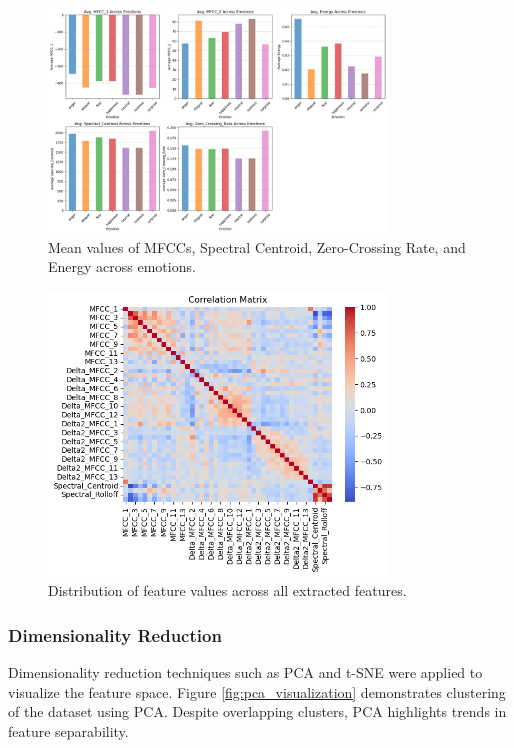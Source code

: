 \documentclass{article}
\begin{document}
\begin{figure}[!h]
    \centering
    \includegraphics[width=0.8\textwidth]{../assets/mfcc_analysis.png}
    \caption{Mean values of MFCCs, Spectral Centroid, Zero-Crossing Rate, and Energy across emotions.}
    \label{fig:mfcc_analysis}
\end{figure}

\begin{figure}[!h]
    \centering
    \includegraphics[width=0.8\textwidth]{../assets/feature_variability.png}
    \caption{Distribution of feature values across all extracted features.}
    \label{fig:feature_variability}
\end{figure}

\subsubsection*{Dimensionality Reduction}

Dimensionality reduction techniques such as PCA and t-SNE were applied to visualize the feature space. 
Figure \ref{fig:pca_visualization} demonstrates clustering of the dataset using PCA. Despite overlapping clusters, 
PCA highlights trends in feature separability.
\end{document}
